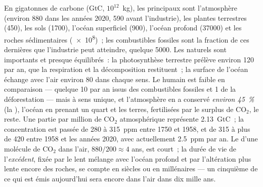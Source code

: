 \begin{proposition}\label{prop:b2:biogeochemical-cycles:carbon}
En gigatonnes de carbone (\unit{GtC}, $10^{12}$~kg), les principaux
 sont l'atmosphère (environ 880 dans les années 2020, 590
avant l'industrie), les plantes terrestres (450), les sols (1700),
l'océan superficiel (900), l'océan profond (\num{37000}) et les roches
sédimentaires
(\num{e8})~; les combustibles fossiles sont la fraction de ces dernières
que l'industrie peut atteindre, quelque \num{5000}. Les  naturels sont
importants et presque équilibrés~: la photosynthèse terrestre prélève
environ 120 par an, que la respiration et la décomposition restituent~; la
surface de l'océan échange avec l'air environ 80 dans chaque sens. Le 
humain est faible en comparaison --- quelque 10 par an issus des
combustibles fossiles et 1 de la déforestation --- mais à sens unique, et
l'atmosphère en a conservé \emph{environ \qty{45}{\%}} (la \emph{}), l'océan en prenant un quart et les terres, fertilisées
par le surplus de
$\mathrm{CO_2}$, le reste. Une partie par million de $\mathrm{CO_2}$ atmosphérique représente
\qty{2.13}{GtC}~; la concentration est passée de 280 à \num{315}~ppm
entre 1750 et 1958, et de 315 à plus de \num{420} entre 1958 et les
années 2020, avec actuellement \qty{2.5}{ppm} par an. Le  d'une molécule de $\mathrm{CO_2}$ dans l'air, $880/200 \approx 4$ ans,
est court~; la durée de vie de l'\emph{excédent}, fixée par le lent
mélange avec l'océan profond et par l'altération plus lente encore des
roches, se compte en siècles ou en millénaires --- un cinquième de ce qui
est émis aujourd'hui sera encore dans l'air dans dix mille ans.
\end{proposition}
